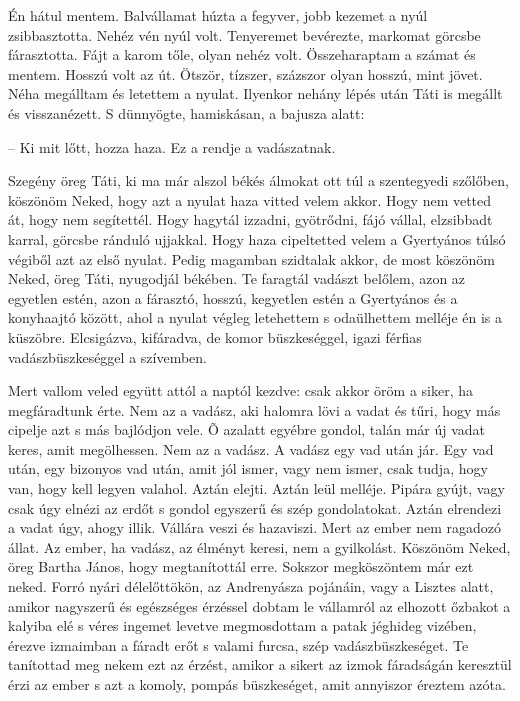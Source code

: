 \documentclass{IEEEtran}
\begin{document}
Én hátul mentem. Balvállamat húzta a fegyver, jobb kezemet a nyúl zsibbasztotta. Nehéz vén nyúl volt. Tenyeremet bevérezte, markomat görcsbe fárasztotta. Fájt a karom tőle, olyan nehéz volt. Összeharaptam a számat és mentem. Hosszú volt az út. Ötször, tízszer, százszor olyan hosszú, mint jövet. Néha megálltam és letettem a nyulat. Ilyenkor nehány lépés után Táti is megállt és visszanézett. S dünnyögte, hamiskásan, a bajusza alatt:

– Ki mit lőtt, hozza haza. Ez a rendje a vadászatnak.

Szegény öreg Táti, ki ma már alszol békés álmokat ott túl a szentegyedi szőlőben, köszönöm Neked, hogy azt a nyulat haza vitted velem akkor. Hogy nem vetted át, hogy nem segítettél. Hogy hagytál izzadni, gyötrődni, fájó vállal, elzsibbadt karral, görcsbe ránduló ujjakkal. Hogy haza cipeltetted velem a Gyertyános túlsó végiből azt az első nyulat. Pedig magamban szidtalak akkor, de most köszönöm Neked, öreg Táti, nyugodjál békében. Te faragtál vadászt belőlem, azon az egyetlen estén, azon a fárasztó, hosszú, kegyetlen estén a Gyertyános és a konyhaajtó között, ahol a nyulat végleg letehettem s odaülhettem melléje én is a küszöbre. Elcsigázva, kifáradva, de komor büszkeséggel, igazi férfias vadászbüszkeséggel a szívemben.

Mert vallom veled együtt attól a naptól kezdve: csak akkor öröm a siker, ha megfáradtunk érte. Nem az a vadász, aki halomra lövi a vadat és tűri, hogy más cipelje azt s más bajlódjon vele. Õ azalatt egyébre gondol, talán már új vadat keres, amit megölhessen. Nem az a vadász. A vadász egy vad után jár. Egy vad után, egy bizonyos vad után, amit jól ismer, vagy nem ismer, csak tudja, hogy van, hogy kell legyen valahol. Aztán elejti. Aztán leül melléje. Pipára gyújt, vagy csak úgy elnézi az erdőt s gondol egyszerű és szép gondolatokat. Aztán elrendezi a vadat úgy, ahogy illik. Vállára veszi és hazaviszi. Mert az ember nem ragadozó állat. Az ember, ha vadász, az élményt keresi, nem a gyilkolást. Köszönöm Neked, öreg Bartha János, hogy megtanítottál erre. Sokszor megköszöntem már ezt neked. Forró nyári délelőttökön, az Andrenyásza pojánáin, vagy a Lisztes alatt, amikor nagyszerű és egészséges érzéssel dobtam le vállamról az elhozott őzbakot a kalyiba elé s véres ingemet levetve megmosdottam a patak jéghideg vizében, érezve izmaimban a fáradt erőt s valami furcsa, szép vadászbüszkeséget. Te tanítottad meg nekem ezt az érzést, amikor a sikert az izmok fáradságán keresztül érzi az ember s azt a komoly, pompás büszkeséget, amit annyiszor éreztem azóta.
\end{document}

